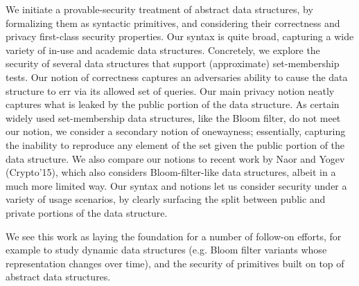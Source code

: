 We initiate a provable-security treatment of abstract data structures, by formalizing them as syntactic primitives, and considering their correctness and privacy first-class security properties.  Our syntax is quite broad, capturing a wide variety of in-use and academic data structures.  Concretely, we explore the security of several data structures that support (approximate) set-membership tests.  Our notion of correctness captures an adversaries ability to cause the data structure to err via its allowed set of queries.  Our main privacy notion neatly captures what is leaked by the public portion of the data structure.  As certain widely used set-membership data structures, like the Bloom filter, do not meet our notion, we consider a secondary notion of onewayness; essentially, capturing the inability to reproduce any element of the set given the public portion of the data structure.  We also compare our notions to recent work by Naor and Yogev (Crypto'15), which also considers Bloom-filter-like data structures, albeit in a much more limited way.  Our syntax and notions let us consider security under a variety of usage scenarios, by clearly surfacing the split between public and private portions of the data structure.

We see this work as laying the foundation for a number of follow-on efforts, for example to study dynamic data structures (e.g. Bloom filter variants whose representation changes over time), and the security of primitives built on top of abstract data structures.